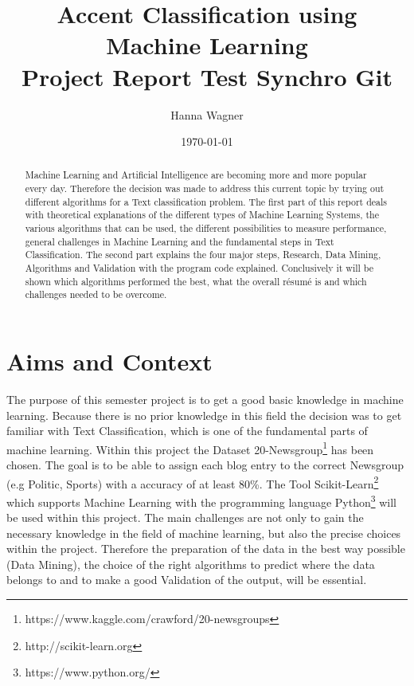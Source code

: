 \documentclass[notitlepage,english]{hgbreport}
\author{Hanna Wagner}
\title{Accent Classification using Machine Learning\\ 
			Project Report Test Synchro Git}
\date{\today}
\begin{document}

\maketitle

\begin{abstract}
\noindent
Machine Learning and Artificial Intelligence are becoming more and more popular every day. Therefore the decision was made to address this current topic by trying out different algorithms for a Text classification problem. The first part of this report deals with theoretical explanations of the different types of Machine Learning Systems, the various algorithms that can be used, the different possibilities to measure performance, general challenges in Machine Learning and the fundamental steps in Text Classification. The second part explains the four major steps, Research, Data Mining, Algorithms and Validation with the program code explained. Conclusively it will be shown which algorithms performed the best, what the overall résumé is and which challenges needed to be overcome.

\end{abstract}


\tableofcontents
\listoffigures
\listoftables

\chapter{Aims and Context}
The purpose of this semester project is to get a good basic knowledge in machine learning. Because there is no prior knowledge in this field the decision was to get familiar with Text Classification, which is one of the fundamental parts of machine learning. 
\newline \newline
Within this project the Dataset 20-Newsgroup\footnote{https://www.kaggle.com/crawford/20-newsgroups} has been chosen. The goal is to be able to assign each blog entry to the correct Newsgroup (e.g Politic, Sports) with a accuracy of at least 80\%. The Tool Scikit-Learn\footnote{http://scikit-learn.org} which supports Machine Learning with the programming language Python\footnote{https://www.python.org/} will be used within this project.
\newline \newline
The main challenges are not only to gain the necessary knowledge in the field of machine learning, but also the precise choices within the project. Therefore the preparation of the data in the best way possible (Data Mining), the choice of the right algorithms to predict where the data belongs to and to make a good Validation of the output, will be essential.
\end{document}
